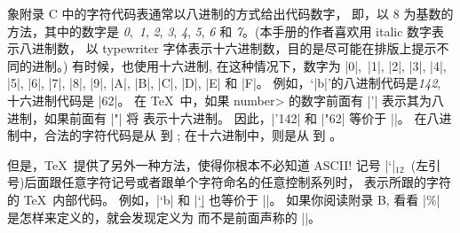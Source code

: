 \danger 象附录 C 中的字符代码表通常以{八进制}的方式给出代码数字，
即，以 8 为基数的方法，其中的数字是 {\it0},~{\it1}, {\it2}, {\it3}, {\it4},
{\it5}, {\it6} 和 {\it7}。(本手册的作者喜欢用 italic 数字表示八进制数，
以 typewriter 字体表示十六进制数，目的是尽可能在排版上提示不同的进制。)
有时候，也使用{十六进制}, 在这种情况下，数字为%
|0|,~|1|, |2|, |3|, |4|, |5|, |6|, |7|, |8|, |9|, |A|, |B|, |C|,
|D|, |E| 和 |F|。%
\1例如，`|b|'的八进制代码是{\it142}, 十六进制代码是 |62|。%
在 \TeX\ 中，如果 \<number> 的数字前面有 |'| 表示其为八进制，如果前面有 |"| 将%
表示十六进制。%
因此，|\char'142| 和 |\char"62| 等价于 ||。%
在八进制中，合法的字符代码是从  到 ;
在十六进制中，则是从  到 。

\danger 但是，\TeX\ 提供了另外一种方法，使得你根本不必知道 ASCII!
记号 |`|$_{12}$~(左引号)后面跟任意字符记号或者跟单个字符命名的任意控制系列时，
表示所跟的字符的 \TeX\ 内部代码。%
例如，|\char`b| 和 |\char`\b| 也等价于 ||。%
如果你阅读附录 B, 看看 |\%| 是怎样来定义的，就会发现定义为
\begintt
\def\%{\char`\%}
\endtt
而不是前面声称的 ||。

